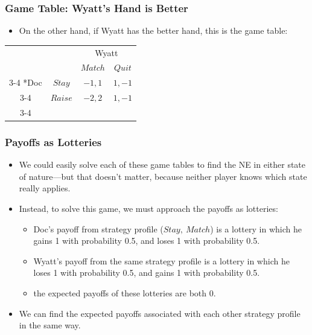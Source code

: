 \begin{frame}
\frametitle{Game Table: Wyatt's Hand is Better}
\begin{itemize}
\item On the other hand, if Wyatt has the better hand, this is the game table:
\end{itemize}
\begin{table}[h]
\centering
 
\begin{tabular}{cc|c|c|}
& \multicolumn{1}{c}{} & \multicolumn{2}{c}{Wyatt}\\
& \multicolumn{1}{c}{} & \multicolumn{1}{c}{$Match$}  & \multicolumn{1}{c}{$Quit$} \\\cline{3-4}
\multirow{2}*{Doc}  & $Stay$ & $-1, 1$ & $1, -1$ \\\cline{3-4}
& $Raise$ & $-2, 2$ & $1,-1$ \\\cline{3-4}
\end{tabular}
\end{table}
\end{frame}

\begin{frame}
\frametitle{Payoffs as Lotteries}
\begin{itemize}
\item We could easily solve each of these game tables to find the NE in either state of nature---but that doesn't matter, because neither player knows which state really applies. 
\item Instead, to solve this game, we must approach the payoffs as lotteries:
\begin{itemize}
\item Doc's payoff from strategy profile ($Stay,~Match$) is a lottery in which he gains 1 with probability 0.5, and loses 1 with probability 0.5.
\item Wyatt's payoff from the same strategy profile is a lottery in which he loses 1 with probability 0.5, and gains 1 with probability 0.5.
\item the expected payoffs of these lotteries are both 0. 
\end{itemize}
\item We can find the expected payoffs associated with each other strategy profile in the same way.
\end{itemize}
\end{frame}

